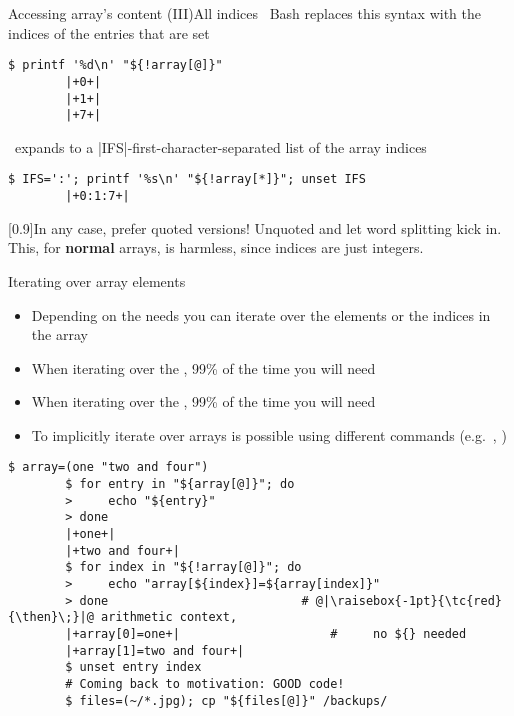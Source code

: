 \begin{frame}[fragile]{Accessing array's content (III)}{All indices}
    \vspace{-2mm}\centering
    \, Bash replaces this syntax with the indices of the entries that are set
    \smallskip
    \begin{lstlisting}[style=MyBash, numbers=none]
        $ printf '%d\n' "${!array[@]}"
        |+0+|
        |+1+|
        |+7+|
    \end{lstlisting}
    \medskip
    \, expands to a \bash|IFS|-first-character-separated list of the array indices
    \smallskip
    \begin{lstlisting}[style=MyBash, numbers=none]
        $ IFS=':'; printf '%s\n' "${!array[*]}"; unset IFS
        |+0:1:7+|
    \end{lstlisting}
    \medskip
    \begin{varblock}{}[0.9\textwidth]{In any case, prefer quoted versions!}
        Unquoted  and  let \alert{word splitting} kick in.
        This, for \textbf{normal} arrays, is harmless, since indices are just integers.
    \end{varblock}
\end{frame}
\begin{frame}[fragile]{Iterating over array elements}
    \vspace{-3mm}
    \begin{itemize}
        \item Depending on the needs you can iterate over the elements or the indices in the array
        \item When iterating over the \textbf{}, 99\% of the time you will need \,
        \item When iterating over the \textbf{}, 99\% of the time you will need \,
        \item To implicitly iterate over arrays is possible using different commands (e.g.\ , )
    \end{itemize}
    \begin{lstlisting}[style=MyBash]
        $ array=(one "two and four")
        $ for entry in "${array[@]}"; do
        >     echo "${entry}"
        > done
        |+one+|
        |+two and four+|
        $ for index in "${!array[@]}"; do
        >     echo "array[${index}]=${array[index]}"
        > done                           # @|\raisebox{-1pt}{\tc{red}{\then}\;}|@ arithmetic context,
        |+array[0]=one+|                     #     no ${} needed
        |+array[1]=two and four+|
        $ unset entry index
        # Coming back to motivation: GOOD code!
        $ files=(~/*.jpg); cp "${files[@]}" /backups/
    \end{lstlisting}
\end{frame}

